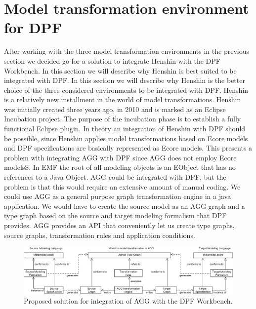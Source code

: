 \section{Model transformation environment for DPF}
\label{tool_choice}

After working with the three model transformation environments in the previous
section we decided go for a solution to integrate Henshin with the DPF
Workbench.
In this section we will describe why Henshin is best suited to be integrated
with DPF. In this section we will describe why Henshin is the better choice of
the three considered environments to be integrated with DPF.
Henshin\cite{Henshin_2010,Henshin} is a relatively new installment in the world
of model transformations. Henshin was initially created three years
ago, in 2010 and is marked as an Eclipse Incubation project. The purpose of the
incubation phase is to establish a fully functional Eclipse plugin. In
theory an integration of Henshin with DPF should be possible, since Henshin
applies model transformations based on Ecore models and DPF specifications are
basically represented as Ecore models. This presents a problem with integrating
AGG with DPF since AGG does not employ Ecore modelsS. In EMF the root of all
modeling objects is an EObject that has no references to a Java Object.
AGG could be integrated with DPF, but the problem is that this would
require an extensive amount of manual coding. We could use AGG as a general
purpose graph transformation engine in a java application. We would have to
create the source model as an AGG graph and a type graph based on the source and
target modeling formalism that DPF provides. AGG provides an API that
conveniently let us create type graphs, source graphs, transformation rules and
application conditions.
 
\begin{figure}[H]
	\centering
	\includegraphics[scale=0.52]{figures/AGG_solution.png}
	\caption[Proposed solution for integration of AGG]
	{Proposed solution for integration of AGG with the DPF Workbench.}
	\label{fig:AGG_Solution}
\end{figure}


